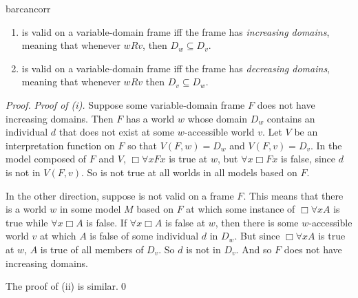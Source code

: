 \begin{observation}{barcancorr}
  \vspace{-1mm}
  \begin{enumerate}[leftmargin=10mm]
    \itemsep0mm
  \item[(i)]  is valid on a variable-domain frame iff the frame has
    \emph{increasing domains}, meaning that whenever $wRv$, then
    $D_w \subseteq D_v$.
    
  \item[(ii)]  is valid on a variable-domain frame iff the frame has
    \emph{decreasing domains}, meaning that whenever $wRv$ then
    $D_v \subseteq D_w$.
  \end{enumerate}
  \vspace{-2mm}
\end{observation}
%
\begin{proof}
  \emph{Proof of (i).} Suppose some variable-domain frame $F$ does not have
  increasing domains. Then $F$ has a world $w$ whose domain $D_w$ contains an
  individual $d$ that does not exist at some $w$-accessible world $v$. Let $V$
  be an interpretation function on $F$ so that $V(F,w) = D_w$ and
  $V(F,v) = D_v$. In the model composed of $F$ and $V$, $\Box \forall x Fx$ is
  true at $w$, but $\forall x \Box Fx$ is false, since $d$ is not in $V(F,v)$.
  So  is not true at all worlds in all models based on $F$.

  In the other direction, suppose  is not valid on a frame $F$. This
  means that there is a world $w$ in some model $M$ based on $F$ at which some
  instance of $\Box \forall x A$ is true while $\forall x \Box A$ is false. If
  $\forall x \Box A$ is false at $w$, then there is some $w$-accessible world
  $v$ at which $A$ is false of some individual $d$ in $D_w$. But since
  $\Box \forall x A$ is true at $w$, $A$ is true of all members of $D_v$. So $d$
  is not in $D_v$. And so $F$ does not have increasing domains.

  The proof of (ii) is similar.\qed
  
\end{proof}



